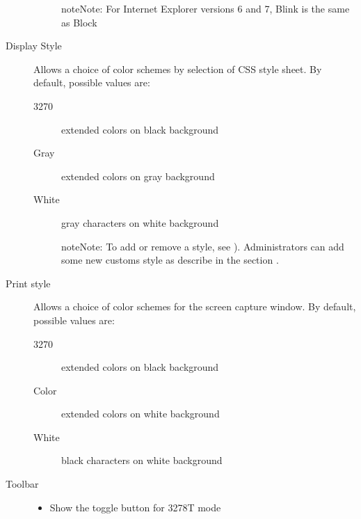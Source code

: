 \documentclass[letterpaper,10pt,english]{sphinxmanual}
\begin{document}
\begin{description}
\begin{description}
\begin{sphinxadmonition}{note}{Note:}
For Internet Explorer versions 6 and 7, Blink is the same as Block
\end{sphinxadmonition}

\end{description}

\item[{Display Style}] \leavevmode
Allows a choice of color schemes by selection of CSS style sheet. By default, possible values are:
\begin{description}
\item[{3270}] \leavevmode
extended colors on black background

\item[{Gray}] \leavevmode
extended colors on gray background

\item[{White}] \leavevmode
gray characters on white background

\begin{sphinxadmonition}{note}{Note:}
To add or remove a style, see {\hyperref[\detokenize{User_Guide:v457ug-customize-display}]{}}). Administrators can add some new customs style as describe in the section {\hyperref[\detokenize{User_Guide:v457ug-customize-display}]{}}.
\end{sphinxadmonition}

\end{description}

\item[{Print style}] \leavevmode
Allows a choice of color schemes for the screen capture window. By default, possible values are:
\begin{description}
\item[{3270}] \leavevmode
extended colors on black background

\item[{Color}] \leavevmode
extended colors on white background

\item[{White}] \leavevmode
black characters on white background

\end{description}

\item[{Toolbar}] \leavevmode\begin{itemize}
\item {} 
Show the toggle button for 3278T mode


\end{itemize}
\end{description}
\end{document}
